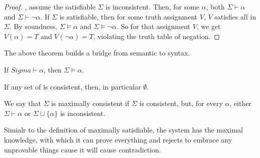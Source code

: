 \begin{proof}
\bwoc, assume the satisfiable $\Sigma$ is inconsistent. Then, for some $\alpha$, both $\Sigma\vdash\alpha$ and $\Sigma\vdash\neg\alpha$. 
If $\Sigma$ is satisfiable, then for some truth assignment $V$, $V$ satisfies all \wff in $\Sigma$. By soundness, $\Sigma\vDash\alpha$ and $\Sigma\vDash\neg\alpha$. So for that assignment $V$, we get $V(\alpha)=T$ and $V(\neg\alpha)=T$, violating the truth table of negation.
\end{proof}

The above theorem builds a bridge from semantic to syntax.

\begin{theorem}
If $Sigma\vdash\alpha$, then $\Sigma\vDash\alpha$.
\end{theorem}

\begin{corollary}
If any set of \wff is consistent, then, in particular $\emptyset$.
\end{corollary}


\begin{definition}
We say that $\Sigma$ is maximally consistent if $\Sigma$ is consistent, but, for every $\alpha$, either $\Sigma\vdash\alpha$ or $\Sigma\cup\{\alpha\}$ is inconsistent.
\end{definition}

Simialr to the definition of maximally satisfiable, the system has the maximal knowledge, with which it can prove everything and rejects to embrace any unprovable things cause it will cause contradiction.

\begin{mdframed}
\end{mdframed}

